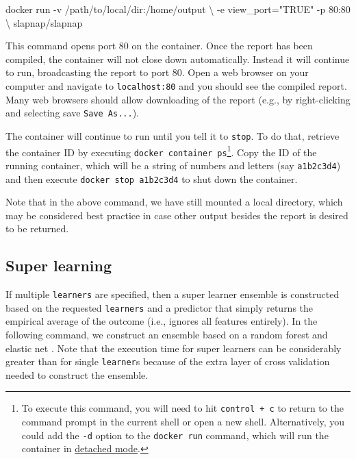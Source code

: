 \documentclass[
]{article}
\newenvironment{Shaded}{\begin{snugshade}}{\end{snugshade}}
\newcommand{\ExtensionTok}[1]{#1}
\newcommand{\NormalTok}[1]{#1}
\newcommand{\StringTok}[1]{\textcolor[rgb]{0.31,0.60,0.02}{#1}}
\begin{document}
\begin{Shaded}
\begin{Highlighting}[]
\ExtensionTok{docker}\NormalTok{ run {-}v /path/to/local/dir:/home/output \textbackslash{}}
\NormalTok{           {-}e view\_port=}\StringTok{"TRUE"}\NormalTok{ {-}p 80:80 \textbackslash{}}
\NormalTok{           slapnap/slapnap}
\end{Highlighting}
\end{Shaded}

This command opens port 80 on the container. Once the report has been compiled, the container will not close down automatically. Instead it will continue to run, broadcasting the report to port 80. Open a web browser on your computer and navigate to \texttt{localhost:80} and you should see the compiled report. Many web browsers should allow downloading of the report (e.g., by right-clicking and selecting save \texttt{Save\ As...}).

The container will continue to run until you tell it to \texttt{stop}. To do that, retrieve the container ID by executing \texttt{docker\ container\ ps}\footnote{To execute this command, you will need to hit \texttt{control\ +\ c} to return to the command prompt in the current shell or open a new shell. Alternatively, you could add the \texttt{-d} option to the \texttt{docker\ run} command, which will run the container in \href{https://docs.docker.com/engine/reference/run/\#detached-vs-foreground}{detached mode}.}. Copy the ID of the running container, which will be a string of numbers and letters (say \texttt{a1b2c3d4}) and then execute \texttt{docker\ stop\ a1b2c3d4} to shut down the container.

Note that in the above command, we have still mounted a local directory, which may be considered best practice in case other output besides the report is desired to be returned.

\hypertarget{super-learning}{%
\subsection{Super learning}\label{super-learning}}

If multiple \texttt{learners} are specified, then a super learner ensemble \citep{vanderlaan2007} is constructed based on the requested \texttt{learners} and a predictor that simply returns the empirical average of the outcome (i.e., ignores all features entirely). In the following command, we construct an ensemble based on a random forest \citep{breiman2001} and elastic net \citep{zou2005}. Note that the execution time for super learners can be considerably greater than for single \texttt{learner}s because of the extra layer of cross validation needed to construct the ensemble.
\end{document}
